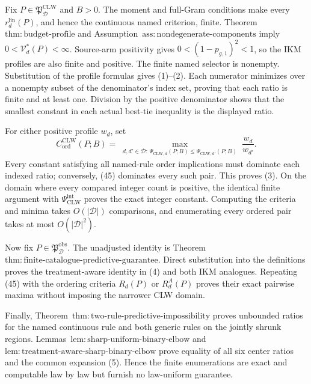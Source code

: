Fix \(P\in\mathfrak P_{\mathcal D}^{\mathrm{CLW}}\) and \(B>0\).  The moment and full-Gram conditions make every \(r_d^{\mathrm{lin}}(P)\), and hence the continuous named criterion, finite.  Theorem~\(\mathrm{thm{:}budget\text{-}profile}\) and Assumption~\(\mathrm{ass{:}nondegenerate\text{-}components}\) imply \(0<\mathcal V_d^*(P)<\infty\).  Source-arm positivity gives \(0<(1-p_{g,1})^2<1\), so the IKM profiles are also finite and positive.  The finite named selector is nonempty.  Substitution of the profile formulas gives (1)--(2).  Each numerator minimizes over a nonempty subset of the denominator's index set, proving that each ratio is finite and at least one.  Division by the positive denominator shows that the smallest constant in each actual best-tie inequality is the displayed ratio.

For either positive profile \(w_d\), set
\[
 C_{\mathrm{ord}}^{\mathrm{CLW}}(P;B)
 =\max_{\substack{d,d'\in\mathcal D:\,
 \Psi_{\mathrm{CLW},d}(P;B)
 \le\Psi_{\mathrm{CLW},d'}(P;B)}}\frac{w_d}{w_{d'}}.       \tag{45}
\]
Every constant satisfying all named-rule order implications must dominate each indexed ratio; conversely, (45) dominates every such pair.  This proves (3).  On the domain where every compared integer count is positive, the identical finite argument with \(\Psi_{\mathrm{CLW}}^{\mathrm{int}}\) proves the exact integer constant.  Computing the criteria and minima takes \(O(|\mathcal D|)\) comparisons, and enumerating every ordered pair takes at most \(O(|\mathcal D|^2)\).

Now fix \(P\in\mathfrak P_{\mathcal D}^{\mathrm{obs}}\).  The unadjusted identity is Theorem~\(\mathrm{thm{:}finite\text{-}catalogue\text{-}predictive\text{-}guarantee}\).  Direct substitution into the definitions proves the treatment-aware identity in (4) and both IKM analogues.  Repeating (45) with the ordering criteria \(R_d(P)\) or \(R_d^A(P)\) proves their exact pairwise maxima without imposing the narrower CLW domain.

Finally, Theorem~\(\mathrm{thm{:}two\text{-}rule\text{-}predictive\text{-}impossibility}\) proves unbounded ratios for the named continuous rule and both generic rules on the jointly shrunk regions.  Lemmas~\(\mathrm{lem{:}sharp\text{-}uniform\text{-}binary\text{-}elbow}\) and \(\mathrm{lem{:}treatment\text{-}aware\text{-}sharp\text{-}binary\text{-}elbow}\) prove equality of all six center ratios and the common expansion (5).  Hence the finite enumerations are exact and computable law by law but furnish no law-uniform guarantee.